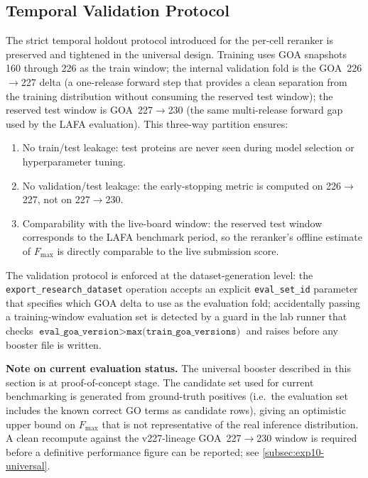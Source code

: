 \subsection{Temporal Validation Protocol}
\label{subsec:universal-temporal-validation}

The strict temporal holdout protocol introduced for the per-cell reranker is
preserved and tightened in the universal design. Training uses GOA snapshots
160 through 226 as the train window; the internal validation fold is the
GOA~226$\to$227 delta (a one-release forward step that provides a clean
separation from the training distribution without consuming the reserved test
window); the reserved test window is GOA~227$\to$230 (the same multi-release
forward gap used by the LAFA evaluation). This three-way partition ensures:

\begin{enumerate}
  \item No train/test leakage: test proteins are never seen during model
    selection or hyperparameter tuning.
  \item No validation/test leakage: the early-stopping metric is computed on
    226$\to$227, not on 227$\to$230.
  \item Comparability with the live-board window: the reserved test window
    corresponds to the LAFA benchmark period, so the reranker's offline
    estimate of $F_{\max}$ is directly comparable to the live submission score.
\end{enumerate}

The validation protocol is enforced at the dataset-generation level: the
\texttt{export\_research\_dataset} operation accepts an explicit
\texttt{eval\_set\_id} parameter that specifies which GOA delta to use as the
evaluation fold; accidentally passing a training-window evaluation set is
detected by a guard in the lab runner that checks
$\texttt{eval\_goa\_version} > \texttt{max(train\_goa\_versions)}$ and raises
before any booster file is written.

\noindent \textbf{Note on current evaluation status.} The universal booster
described in this section is at proof-of-concept stage. The candidate set used
for current benchmarking is generated from ground-truth positives (i.e.\ the
evaluation set includes the known correct GO terms as candidate rows), giving
an optimistic upper bound on $F_{\max}$ that is not representative of the
real inference distribution. A clean recompute against the v227-lineage
GOA~227$\to$230 window is required before a definitive performance figure can
be reported; see \cref{subsec:exp10-universal}.


